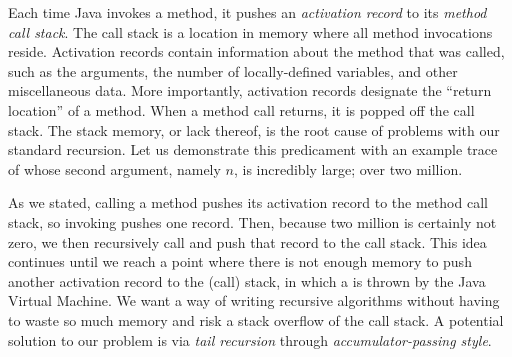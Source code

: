 Each time Java invokes a method, it pushes an \textit{activation record} to its \textit{method call stack}. The call stack is a location in memory where all method invocations reside. Activation records contain information about the method that was called, such as the arguments, the number of locally-defined variables, and other miscellaneous data. More importantly, activation records designate the ``return location'' of a method. When a method call returns, it is popped off the call stack. The stack memory, or lack thereof, is the root cause of problems with our standard recursion. Let us demonstrate this predicament with an example trace of  whose second argument, namely $n$, is incredibly large; over two million.

As we stated, calling a method pushes its activation record to the method call stack, so invoking  pushes one record. Then, because two million is certainly not zero, we then recursively call  and push that record to the call stack. This idea continues until we reach a point where there is not enough memory to push another activation record to the (call) stack, in which a  is thrown by the Java Virtual Machine. We want a way of writing recursive algorithms without having to waste so much memory and risk a stack overflow of the call stack. A potential solution to our problem is via \textit{tail recursion} through \textit{accumulator-passing style}.

